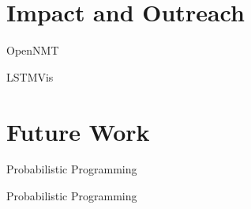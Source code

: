 \documentclass{beamer}
\begin{document}
\section{Impact and Outreach}

\begin{frame}{OpenNMT}

\end{frame}

\begin{frame}{LSTMVis}

\end{frame}



\section{Future Work}

\begin{frame}{Probabilistic Programming}

\end{frame}

\begin{frame}{Probabilistic Programming}

\end{frame}


\begin{frame}

\end{frame}



\end{document}
